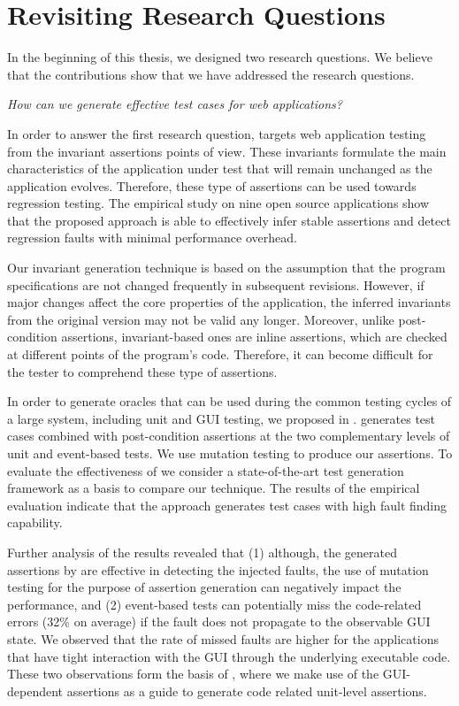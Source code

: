 \section{Revisiting Research Questions} 
In the beginning of this thesis, we designed two research questions. We believe that the contributions show that we have addressed the research questions.

\emph{How can we generate effective test cases for \javascript web applications?}

In order to answer the first research question,  targets web application testing from the invariant assertions points of view. These invariants formulate the main characteristics of the application under test that will remain unchanged as the application evolves. Therefore, these type of assertions can be used towards regression testing. The empirical study on nine open source \javascript applications show that the proposed approach is able to effectively infer stable assertions and 
detect regression faults with minimal performance overhead.

Our invariant generation technique is based on the assumption that the program specifications are not changed frequently in subsequent revisions. However, if major changes affect the core properties of the application, the inferred invariants from the original version may not be valid any longer. Moreover, unlike post-condition assertions, invariant-based ones are inline assertions, which are checked at different points of the program's code. Therefore, it can become difficult for the tester to comprehend these type of assertions.

In order to generate oracles that can be used during the common testing cycles of a large system, including unit and GUI testing, we proposed \jseft in . \jseft generates test cases combined with post-condition assertions at the two complementary levels of unit and event-based tests. We use mutation testing to produce our assertions. 
To evaluate the effectiveness of \jseft we consider a state-of-the-art \javascript test generation framework as a basis to compare our technique. The results of the empirical evaluation indicate that the approach generates test cases with high fault finding capability. 

Further analysis of the results revealed that (1) although, the generated assertions by \jseft are effective in detecting the injected faults, the use of mutation testing for the purpose of assertion generation can negatively impact the performance, and (2) event-based tests can potentially miss the code-related errors (32\% on average) if the fault does not propagate to the observable GUI state. We observed that the rate of missed faults are higher for the applications that have tight interaction with the GUI through the underlying executable code. These two observations form the basis of , where we make use of the GUI-dependent assertions as a guide to generate code related unit-level assertions.

